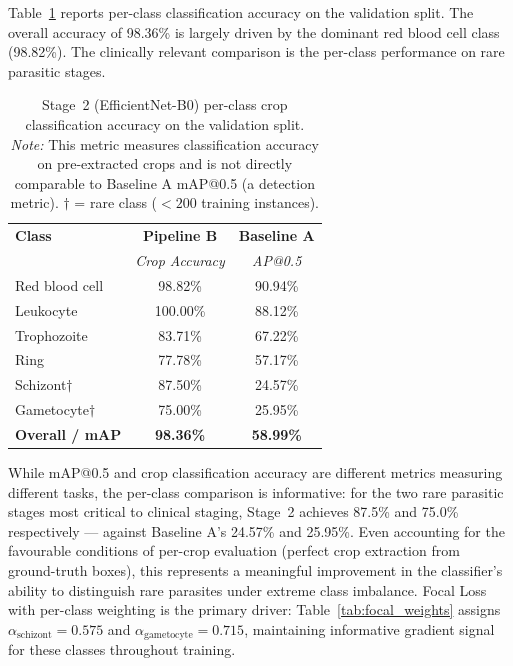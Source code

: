 \documentclass[review,12pt]{elsarticle}
\begin{document}
Table~\ref{tab:stage2_acc} reports per-class classification accuracy on
the validation split. The overall accuracy of 98.36\% is largely driven
by the dominant red blood cell class (98.82\%). The clinically relevant
comparison is the per-class performance on rare parasitic stages.

\begin{table}[H]
\centering
\small
\caption{Stage~2 (EfficientNet-B0) per-class crop classification accuracy
  on the validation split. \textit{Note:} This metric measures
  classification accuracy on pre-extracted crops and is not directly
  comparable to Baseline A mAP@0.5 (a detection metric).
  $\dagger$ = rare class ($<200$ training instances).}
\label{tab:stage2_acc}
\renewcommand{\arraystretch}{1.2}
\begin{tabular}{lcc}
\toprule
\textbf{Class} & \textbf{Pipeline B} & \textbf{Baseline A} \\
               & \textit{Crop Accuracy} & \textit{AP@0.5} \\
\midrule
Red blood cell        & 98.82\%  & 90.94\% \\
Leukocyte             & 100.00\% & 88.12\% \\
Trophozoite           & 83.71\%  & 67.22\% \\
Ring                  & 77.78\%  & 57.17\% \\
Schizont$\dagger$     & 87.50\%  & 24.57\% \\
Gametocyte$\dagger$   & 75.00\%  & 25.95\% \\
\midrule
\textbf{Overall / mAP} & \textbf{98.36\%} & \textbf{58.99\%} \\
\bottomrule
\end{tabular}
\end{table}

While mAP@0.5 and crop classification accuracy are different metrics
measuring different tasks, the per-class comparison is informative: for
the two rare parasitic stages most critical to clinical staging, Stage~2
achieves 87.5\% and 75.0\% respectively --- against Baseline A's 24.57\%
and 25.95\%. Even accounting for the favourable conditions of per-crop
evaluation (perfect crop extraction from ground-truth boxes), this
represents a meaningful improvement in the classifier's ability to
distinguish rare parasites under extreme class imbalance. Focal Loss with
per-class weighting is the primary driver: Table~\ref{tab:focal_weights}
assigns $\alpha_{\text{schizont}} = 0.575$ and $\alpha_{\text{gametocyte}}
= 0.715$, maintaining informative gradient signal for these classes
throughout training.
\end{document}
